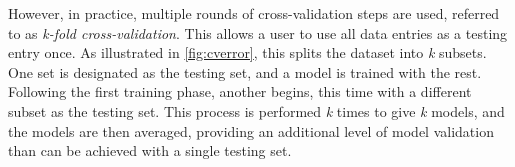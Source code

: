 However, in practice, multiple rounds of cross-validation steps are used,
referred to as \textit{k-fold cross-validation}. This allows a user to use all
data entries as a testing entry once.  As illustrated in \ref{fig:cverror},
this splits the dataset into \textit{k} subsets. One set is designated as the
testing set, and a model is trained with the rest. Following the first training
phase, another begins, this time with a different subset as the testing set.
This process is performed \textit{k} times to give \textit{k} models, and the
models are then averaged, providing an additional level of model validation
than can be achieved with a single testing set.

